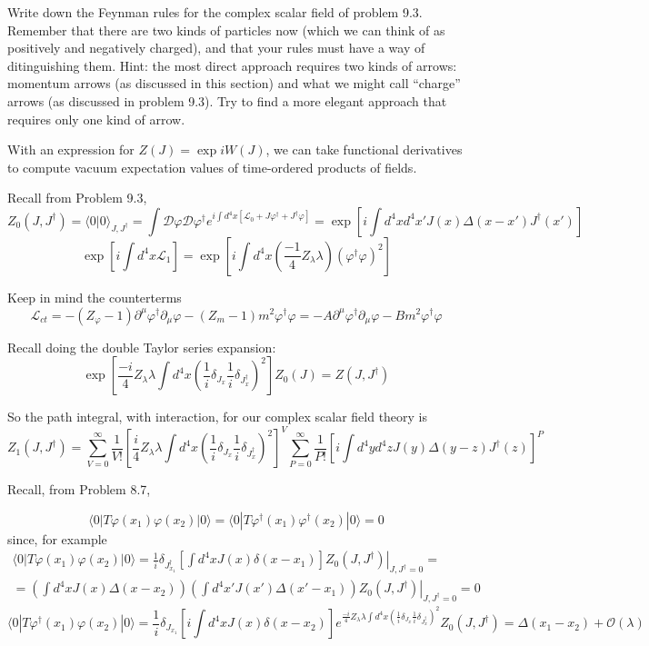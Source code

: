 \documentclass[twoside]{amsart}
\newcommand{\problemhead}[1]
  {\smallskip
   \noindent{\large\bf Problem #1.}
   }
\newcommand{\solutionhead}[1]
  {\smallskip
   \noindent{\large\bf Solution #1.}
   }
\begin{document}
\problemhead{10.2} Write down the Feynman rules for the complex scalar field of problem 9.3.  Remember that there are two kinds of particles now (which we can think of as positively and negatively charged), and that your rules must have a way of ditinguishing them.  Hint: the most direct approach requires two kinds of arrows: momentum arrows (as discussed in this section) and what we might call ``charge'' arrows (as discussed in problem 9.3).  Try to find a more elegant approach that requires only one kind of arrow.  

\solutionhead{10.2} With an expression for $Z(J) = \exp{ i W(J)}$, we can take functional derivatives to compute vacuum expectation values of time-ordered products of fields.  

Recall from Problem 9.3, 
\[
Z_0(J, J^{\dag} ) = \langle 0 | 0 \rangle_{J, J^{\dag}} = \int \mathcal{D}\varphi \mathcal{D} \varphi^{\dag} e^{ i \int d^4x [ \mathcal{L}_0 + J \varphi^{\dag} + J^{\dag} \varphi ] } = \exp{ \left[ i \int d^4x d^4x' J(x) \Delta(x-x') J^{\dag}(x') \right] }
\]
\[
\exp{ \left[ i \int d^4x \mathcal{L}_1  \right]} = \exp{ \left[ i \int d^4x \left( \frac{-1}{4} Z_{\lambda} \lambda \right) (\varphi^{\dag} \varphi)^2 \right] }
\]

Keep in mind the counterterms 
\[
\mathcal{L}_{ct} = - (Z_{\varphi} -  1 ) \partial^{\mu} \varphi^{\dag} \partial_{\mu} \varphi - (Z_m-1) m^2 \varphi^{\dag} \varphi = - A \partial^{\mu} \varphi^{\dag} \partial_{\mu} \varphi - B m^2 \varphi^{\dag} \varphi
\]

Recall doing the double Taylor series expansion:
\[
\exp{ \left[ \frac{-i }{4} Z_{\lambda} \lambda \int d^4x \left( \frac{1}{i} \delta_{J_x} \frac{1}{i} \delta_{J_x^{\dag}} \right)^2 \right] } Z_0(J) = Z(J,J^{\dag})
\]

So the path integral, with interaction, for our complex scalar field theory is 
\[
Z_1(J,J^{\dag}) = \sum_{V=0}^{\infty} \frac{1}{V!} \left[ \frac{i}{4} Z_{\lambda} \lambda \int d^4x \left( \frac{1}{i} \delta_{J_x} \frac{1}{i} \delta_{J_x^{\dag}} \right)^2 \right]^V \sum_{P=0}^{\infty} \frac{1}{P!} \left[ i \int d^4y d^4z J(y) \Delta(y-z) J^{\dag}(z) \right]^P 
\]

Recall, from Problem 8.7,

\[
\langle 0 |T \varphi(x_1) \varphi(x_2) | 0 \rangle = \langle 0 | T\varphi^{\dag}(x_1) \varphi^{\dag}(x_2) | 0 \rangle = 0 
\]
since, for example
\[
\begin{gathered}
  \langle 0 | T\varphi(x_1) \varphi(x_2) | 0 \rangle = \frac{1}{i} \delta_{J^{\dag}_{x_1} } \left[ \int d^4x J(x) \delta(x-x_1) \right] \left. Z_0(J,J^{\dag}) \right|_{J,J^{\dag}=0 } = \\
  = ( \int d^4x J(x) \Delta(x-x_2) ) (\int d^4x' J(x') \Delta(x'-x_1)) \left. Z_0(J,J^{\dag} )\right|_{J,J^{\dag} = 0} = 0 
\end{gathered}
\]
\[
\langle 0 | T\varphi^{\dag}(x_1) \varphi(x_2) | 0 \rangle = \frac{1}{i} \delta_{J_{x_1}} \left[ i \int d^4x J(x) \delta(x-x_2) \right] e^{ \frac{-i}{4} Z_{\lambda} \lambda \int d^4x \left( \frac{1}{i} \delta_{J_x} \frac{1}{i} \delta_{J_x^{\dag} } \right)^2 } Z_0(J,J^{\dag} ) = \Delta(x_1-x_2) + \mathcal{O}(\lambda)
\]
\end{document}
